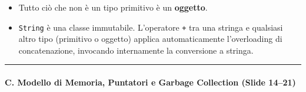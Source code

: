 \documentclass[11pt,a4paper]{article}
\newcommand{\passthrough}[1]{#1}
\providecommand{\tightlist}{\setlength{\itemsep}{0pt}\setlength{\parskip}{0pt}}
\begin{document}
\begin{itemize}
  \begin{itemize}
  \tightlist
  \item
    Tutto ciò che non è un tipo primitivo è un \textbf{oggetto}.
  \item
    \passthrough{\lstinline!String!} è una classe immutabile.
    L'operatore \passthrough{\lstinline!+!} tra una stringa e qualsiasi
    altro tipo (primitivo o oggetto) applica automaticamente
    l'overloading di concatenazione, invocando internamente la
    conversione a stringa.
  \end{itemize}
\end{itemize}

\begin{center}\rule{0.5\linewidth}{0.5pt}\end{center}

\paragraph{C. Modello di Memoria, Puntatori e Garbage Collection (Slide
14--21)}\label{c.-modello-di-memoria-puntatori-e-garbage-collection-slide-1421}
\end{document}
